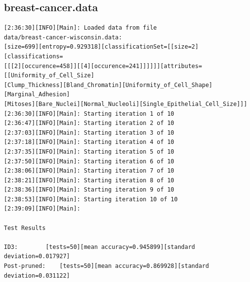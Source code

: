 \documentclass[10pt]{report}
\begin{document}
\subsection*{breast-cancer.data}
{\small
\begin{verbatim}
[2:36:30][INFO][Main]: Loaded data from file
data/breast-cancer-wisconsin.data:
[size=699][entropy=0.929318][classificationSet=[[size=2][classifications=
[[[2][occurence=458]][[4][occurence=241]]]]]][attributes=[[Uniformity_of_Cell_Size]
[Clump_Thickness][Bland_Chromatin][Uniformity_of_Cell_Shape][Marginal_Adhesion]
[Mitoses][Bare_Nuclei][Normal_Nucleoli][Single_Epithelial_Cell_Size]]] 
[2:36:30][INFO][Main]: Starting iteration 1 of 10 
[2:36:47][INFO][Main]: Starting iteration 2 of 10 
[2:37:03][INFO][Main]: Starting iteration 3 of 10  
[2:37:18][INFO][Main]: Starting iteration 4 of 10 
[2:37:35][INFO][Main]: Starting iteration 5 of 10 
[2:37:50][INFO][Main]: Starting iteration 6 of 10 
[2:38:06][INFO][Main]: Starting iteration 7 of 10  
[2:38:21][INFO][Main]: Starting iteration 8 of 10 
[2:38:36][INFO][Main]: Starting iteration 9 of 10 
[2:38:53][INFO][Main]: Starting iteration 10 of 10 
[2:39:09][INFO][Main]: 

Test Results

ID3:		[tests=50][mean accuracy=0.945899][standard deviation=0.017927]
Post-pruned:	[tests=50][mean accuracy=0.869928][standard deviation=0.031122] 

\end{verbatim}
}






\end{document}
